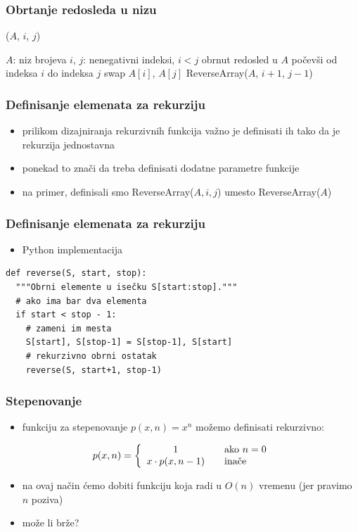 \documentclass[compress,aspectratio=169]{beamer}
\begin{document}
\begin{frame}[fragile]
  \frametitle{Obrtanje redosleda u nizu}
($A$, $i$, $j$)
\begin{algorithmic}
\REQUIRE $A$: niz brojeva
\REQUIRE $i$, $j$: nenegativni indeksi, $i<j$
\ENSURE obrnut redosled u $A$ počevši od indeksa $i$ do indeksa $j$
  \STATE swap $A[i]$, $A[j]$
  \STATE ReverseArray($A$, $i+1$, $j-1$)
\ENDIF
\end{algorithmic}
\end{frame}
\begin{frame}[fragile]
  \frametitle{Definisanje elemenata za rekurziju}
  \begin{itemize}
    \item prilikom dizajniranja rekurzivnih funkcija važno je definisati ih tako da je rekurzija jednostavna
    \item ponekad to znači da treba definisati dodatne parametre funkcije
    \item na primer, definisali smo ReverseArray($A, i, j$) umesto ReverseArray($A$)
  \end{itemize}
\end{frame}
\begin{frame}[fragile]
  \frametitle{Definisanje elemenata za rekurziju}
  \begin{itemize}
    \item Python implementacija
  \end{itemize}
\begin{verbatim}
def reverse(S, start, stop):
  """Obrni elemente u isečku S[start:stop]."""
  # ako ima bar dva elementa
  if start < stop - 1:
    # zameni im mesta
    S[start], S[stop-1] = S[stop-1], S[start]
    # rekurzivno obrni ostatak
    reverse(S, start+1, stop-1)               
\end{verbatim}
\end{frame}

\begin{frame}[fragile]
  \frametitle{Stepenovanje}
  \begin{itemize}
    \item funkciju za stepenovanje $p(x,n) = x^n$ možemo definisati rekurzivno:
  \end{itemize}
  $$ p(x,n) = \left\{ \begin{array}{c l} 1 & \quad \text{ako } n=0 \\x\cdot p(x, n-1) & \quad \text{inače}\end{array}\right. $$
  \begin{itemize}
    \item na ovaj način ćemo dobiti funkciju koja radi u $O(n)$ vremenu (jer pravimo $n$ poziva)
    \item može li brže?
  \end{itemize}
\end{frame}
\end{document}
